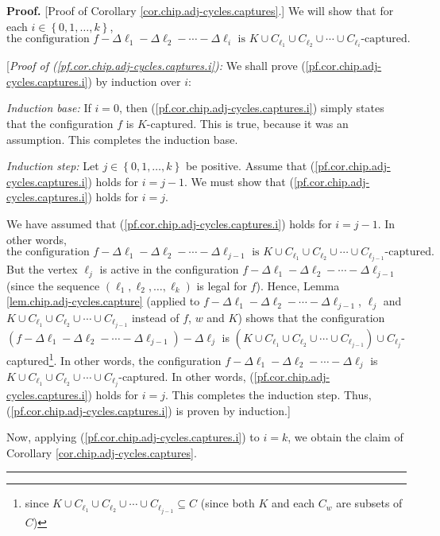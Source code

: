 \documentclass[numbers=enddot,12pt,final,onecolumn,notitlepage]{scrartcl}%
\theoremstyle{definition}
\newenvironment{proof}[1][Proof]{\noindent\textbf{#1.} }{\ \rule{0.5em}{0.5em}}
\begin{document}
\begin{proof}
[Proof of Corollary \ref{cor.chip.adj-cycles.captures}.] We will show that for
each $i\in\left\{  0,1,\ldots,k\right\}  $,
\begin{equation}
\text{the configuration }f-\Delta\ell_{1}-\Delta\ell_{2}-\cdots-\Delta\ell
_{i}\text{ is }K\cup C_{\ell_{1}}\cup C_{\ell_{2}}\cup\cdots\cup C_{\ell_{i}%
}\text{-captured.}\label{pf.cor.chip.adj-cycles.captures.i}%
\end{equation}


[\textit{Proof of (\ref{pf.cor.chip.adj-cycles.captures.i}):} We shall prove
(\ref{pf.cor.chip.adj-cycles.captures.i}) by induction over $i$:

\textit{Induction base:} If $i=0$, then
(\ref{pf.cor.chip.adj-cycles.captures.i}) simply states that the configuration
$f$ is $K$-captured. This is true, because it was an assumption. This
completes the induction base.

\textit{Induction step:} Let $j\in\left\{  0,1,\ldots,k\right\}  $ be
positive. Assume that (\ref{pf.cor.chip.adj-cycles.captures.i}) holds for
$i=j-1$. We must show that (\ref{pf.cor.chip.adj-cycles.captures.i}) holds for
$i=j$.

We have assumed that (\ref{pf.cor.chip.adj-cycles.captures.i}) holds for
$i=j-1$. In other words,
\[
\text{the configuration }f-\Delta\ell_{1}-\Delta\ell_{2}-\cdots-\Delta
\ell_{j-1}\text{ is }K\cup C_{\ell_{1}}\cup C_{\ell_{2}}\cup\cdots\cup
C_{\ell_{j-1}}\text{-captured.}%
\]
But the vertex $\ell_{j}$ is active in the configuration $f-\Delta\ell
_{1}-\Delta\ell_{2}-\cdots-\Delta\ell_{j-1}$ (since the sequence $\left(
\ell_{1},\ell_{2},\ldots,\ell_{k}\right)  $ is legal for $f$). Hence, Lemma
\ref{lem.chip.adj-cycles.capture} (applied to $f-\Delta\ell_{1}-\Delta\ell
_{2}-\cdots-\Delta\ell_{j-1}$, $\ell_{j}$ and $K\cup C_{\ell_{1}}\cup
C_{\ell_{2}}\cup\cdots\cup C_{\ell_{j-1}}$ instead of $f$, $w$ and $K$) shows
that the configuration $\left(  f-\Delta\ell_{1}-\Delta\ell_{2}-\cdots
-\Delta\ell_{j-1}\right)  -\Delta\ell_{j}$ is $\left(  K\cup C_{\ell_{1}}\cup
C_{\ell_{2}}\cup\cdots\cup C_{\ell_{j-1}}\right)  \cup C_{\ell_{j}}%
$-captured\footnote{since $K\cup C_{\ell_{1}}\cup C_{\ell_{2}}\cup\cdots\cup
C_{\ell_{j-1}}\subseteq C$ (since both $K$ and each $C_{w}$ are subsets of
$C$)}. In other words, the configuration $f-\Delta\ell_{1}-\Delta\ell
_{2}-\cdots-\Delta\ell_{j}$ is $K\cup C_{\ell_{1}}\cup C_{\ell_{2}}\cup
\cdots\cup C_{\ell_{j}}$-captured. In other words,
(\ref{pf.cor.chip.adj-cycles.captures.i}) holds for $i=j$. This completes the
induction step. Thus, (\ref{pf.cor.chip.adj-cycles.captures.i}) is proven by induction.]

Now, applying (\ref{pf.cor.chip.adj-cycles.captures.i}) to $i=k$, we obtain
the claim of Corollary \ref{cor.chip.adj-cycles.captures}.
\end{proof}
\end{document}
